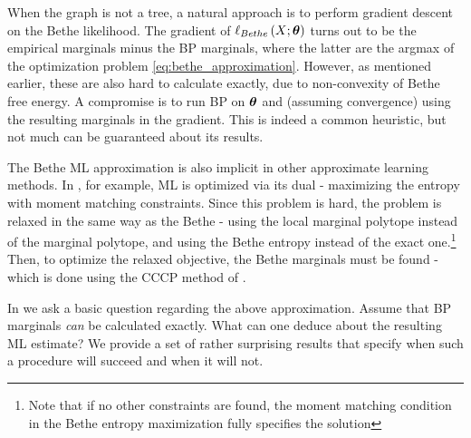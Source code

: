 When the graph is not a tree, a natural approach is to perform gradient descent on the Bethe likelihood.
The gradient of $\ell_{Bethe}\left(X;\boldsymbol{\theta}\right)$ turns out to be the empirical marginals minus the BP marginals, where the  latter are the argmax of the optimization problem  \eqref{eq:bethe_approximation}.
However, as mentioned earlier, these are also hard to calculate exactly, due to non-convexity of Bethe free energy.
A compromise is to run BP on $\boldsymbol{\theta}$ and (assuming convergence) using the resulting marginals in the gradient.
This is indeed a common heuristic, but not much can be guaranteed about its results.

The Bethe ML approximation is also implicit in other approximate learning methods.
In \cite{ganapathi2012constrained}, for example, ML is optimized via its dual - maximizing the entropy with moment matching constraints.
Since this problem is hard, the problem is relaxed in the same way as the Bethe - using the local marginal polytope instead of the marginal polytope, and using the Bethe entropy instead of the exact one.\footnote{Note that if no other constraints are found, the moment matching condition in the Bethe entropy maximization fully specifies the solution}
Then, to optimize the relaxed objective, the Bethe marginals must be found - which is done using the CCCP method of \cite{yuille2002cccp}.


In \cite{heinemann2012cannot} we ask a basic question regarding the above approximation. Assume that BP marginals {\em can} be calculated exactly. What can one deduce about the resulting ML estimate? We provide a set of rather surprising results that specify when such a procedure will succeed and when it will not.

